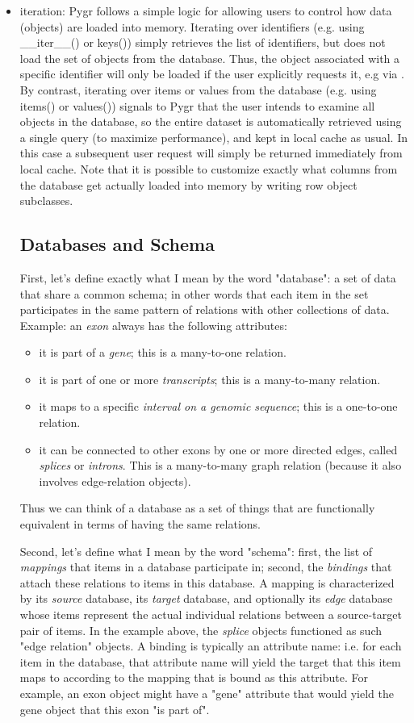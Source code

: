 \documentclass{howto}
\begin{document}
\begin{itemize}
\item iteration: Pygr follows a simple logic for allowing users to control
how data (objects) are loaded into memory.  Iterating over identifiers
(e.g. using __iter__() or keys()) simply retrieves the list of identifiers,
but does not load the set of objects from the database.  Thus, the object
associated with a specific identifier will only be loaded if the user
explicitly requests it, e.g via .  By contrast, iterating over
items or values from the database (e.g. using items() or values()) signals
to Pygr that the user intends to examine all objects in the database, so
the entire dataset is automatically retrieved using a single query (to 
maximize performance), and kept in local cache as usual.  In this case
a subsequent user request  will simply be returned immediately
from local cache.  Note that it is possible to customize exactly what
columns from the database get actually loaded into memory
by writing row object subclasses.

\subsection{Databases and Schema}
First, let's define exactly what I mean by the word "database": a
set of data that share a common schema; in other words that each item
in the set participates in the same pattern of relations with other collections
of data.  Example: an {\em exon} always has the following attributes: 
\begin{itemize}
\item it is part of a {\em gene}; this is a many-to-one relation.
\item it is part of one or more {\em transcripts}; this is a many-to-many relation.
\item it maps to a specific {\em interval on a genomic sequence};
this is a one-to-one relation.
\item it can be connected to other exons by one or more directed edges, called
{\em splices} or {\em introns}.  This is a many-to-many graph relation
(because it also involves edge-relation objects).
\end{itemize}
Thus we can think of a database as a set of things that are functionally
equivalent in terms of having the same relations.

Second, let's define what I mean by the word "schema": first, the
list of {\em mappings} that items in a database participate in; second,
the {\em bindings} that attach these relations to items in this database.
A mapping is characterized by its {\em source} database, its {\em target}
database, and optionally its {\em edge} database whose items represent the
actual individual relations between a source-target pair of items.  In the example
above, the {\em splice} objects functioned as such "edge relation" objects.
A binding is typically an attribute name: i.e. for each item in the database,
that attribute name will yield the target that this item maps to according
to the mapping that is bound as this attribute.  For example, an exon object
might have a "gene" attribute that would yield the gene object that this 
exon "is part of".


\end{itemize}
\end{document}

